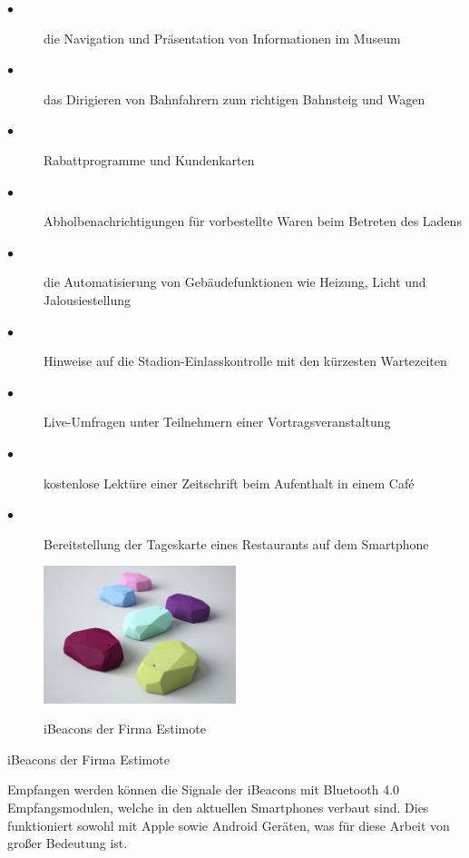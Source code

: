 \glqq 
\begin{description}
\item[$\bullet$]die Navigation und Präsentation von Informationen im Museum

\item[$\bullet$]das Dirigieren von Bahnfahrern zum richtigen Bahnsteig und Wagen

\item[$\bullet$]Rabattprogramme und Kundenkarten

\item[$\bullet$]Abholbenachrichtigungen für vorbestellte Waren beim Betreten des Ladens

\item[$\bullet$]die Automatisierung von Gebäudefunktionen wie Heizung, Licht und Jalousiestellung

\item[$\bullet$]Hinweise auf die Stadion-Einlasskontrolle mit den kürzesten Wartezeiten

\item[$\bullet$]Live-Umfragen unter Teilnehmern einer Vortragsveranstaltung

\item[$\bullet$]kostenlose Lektüre einer Zeitschrift beim Aufenthalt in einem Café

\item[$\bullet$]Bereitstellung der Tageskarte eines Restaurants auf dem Smartphone

\end{description}
\grqq
\cite{BeaconGolem}


\begin{figure}
  \centering
    \includegraphics[width=0.5\textwidth]{ref/images/ibeacon.jpg}
   \caption{iBeacons der Firma Estimote}
  \label{fig:iBeacons}
   \cite{iBeacons}
\end{figure}


iBeacons der Firma Estimote

Empfangen werden können die Signale der iBeacons mit Bluetooth 4.0 Empfangsmodulen, welche in den aktuellen Smartphones verbaut sind. Dies funktioniert sowohl mit Apple sowie Android Geräten, was für diese Arbeit von großer Bedeutung ist.